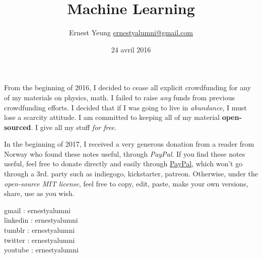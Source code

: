 \documentclass[10pt]{amsart}
\title{Machine Learning}
\author{Ernest Yeung \href{mailto:ernestyalumni@gmail.com}{ernestyalumni@gmail.com}}
\date{24 avril 2016}
\begin{document}

\maketitle


From the beginning of 2016, I decided to cease all explicit crowdfunding for any of my materials on physics, math.  I failed to raise \emph{any} funds from previous crowdfunding efforts.  I decided that if I was going to live in \emph{abundance}, I must lose a scarcity attitude.  I am committed to keeping all of my material \textbf{open-sourced}.  I give all my stuff \emph{for free}.   

In the beginning of 2017, I received a very generous donation from a reader from Norway who found these notes useful, through \emph{PayPal}.  If you find these notes useful, feel free to donate directly and easily through \href{https://www.paypal.com/cgi-bin/webscr?cmd=_donations&business=ernestsaveschristmas%2bpaypal%40gmail%2ecom&lc=US&item_name=ernestyalumni&currency_code=USD&bn=PP%2dDonationsBF%3abtn_donateCC_LG%2egif%3aNonHosted}{PayPal}, which won't go through a 3rd. party such as indiegogo, kickstarter, patreon.  Otherwise, under the \emph{open-source MIT license}, feel free to copy, edit, paste, make your own versions, share, use as you wish.    

\noindent gmail        : ernestyalumni \\
linkedin     : ernestyalumni \\
tumblr       : ernestyalumni \\
twitter      : ernestyalumni \\
youtube      : ernestyalumni \\



\tableofcontents
\end{document}
